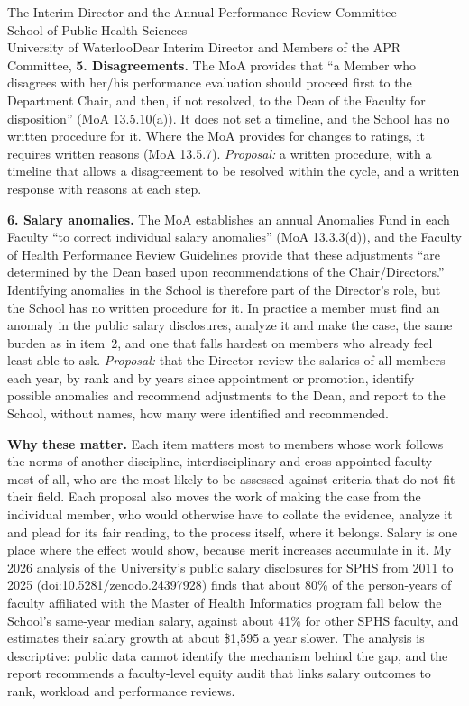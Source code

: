 \begin{aprletter}{%
The Interim Director and the Annual Performance Review Committee\\
School of Public Health Sciences\\
University of Waterloo}{Dear Interim Director and Members of the APR Committee,}
\textbf{5. Disagreements.} The MoA provides that ``a Member who disagrees with her/his performance evaluation should proceed first to the Department Chair, and then, if not resolved, to the Dean of the Faculty for disposition'' (MoA 13.5.10(a)). It does not set a timeline, and the School has no written procedure for it. Where the MoA provides for changes to ratings, it requires written reasons (MoA 13.5.7). \emph{Proposal:} a written procedure, with a timeline that allows a disagreement to be resolved within the cycle, and a written response with reasons at each step.

\textbf{6. Salary anomalies.} The MoA establishes an annual Anomalies Fund in each Faculty ``to correct individual salary anomalies'' (MoA 13.3.3(d)), and the Faculty of Health Performance Review Guidelines provide that these adjustments ``are determined by the Dean based upon recommendations of the Chair/Directors.'' Identifying anomalies in the School is therefore part of the Director's role, but the School has no written procedure for it. In practice a member must find an anomaly in the public salary disclosures, analyze it and make the case, the same burden as in item~2, and one that falls hardest on members who already feel least able to ask. \emph{Proposal:} that the Director review the salaries of all members each year, by rank and by years since appointment or promotion, identify possible anomalies and recommend adjustments to the Dean, and report to the School, without names, how many were identified and recommended.

\textbf{Why these matter.} Each item matters most to members whose work follows the norms of another discipline, interdisciplinary and cross-appointed faculty most of all, who are the most likely to be assessed against criteria that do not fit their field. Each proposal also moves the work of making the case from the individual member, who would otherwise have to collate the evidence, analyze it and plead for its fair reading, to the process itself, where it belongs. Salary is one place where the effect would show, because merit increases accumulate in it. My 2026 analysis of the University's public salary disclosures for SPHS from 2011 to 2025 (doi:10.5281/zenodo.24397928) finds that about 80\% of the person-years of faculty affiliated with the Master of Health Informatics program fall below the School's same-year median salary, against about 41\% for other SPHS faculty, and estimates their salary growth at about \$1,595 a year slower. The analysis is descriptive: public data cannot identify the mechanism behind the gap, and the report recommends a faculty-level equity audit that links salary outcomes to rank, workload and performance reviews.


\end{aprletter}
